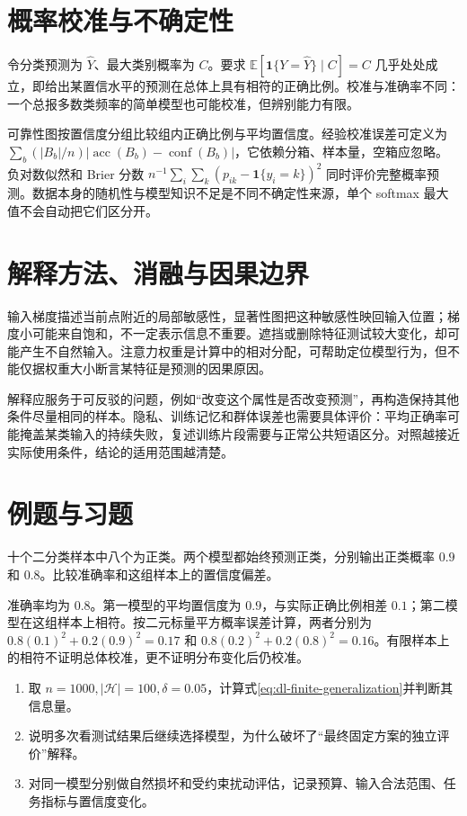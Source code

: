 \documentclass[UTF8,12pt,a4paper,fontset=fandol]{ctexbook}
\begin{document}
\section{概率校准与不确定性}
令分类预测为 $\widehat Y$、最大类别概率为 $C$。要求 $\mathbb E[\mathbf1\{Y=\widehat Y\}\mid C]=C$ 几乎处处成立，即给出某置信水平的预测在总体上具有相符的正确比例。校准与准确率不同：一个总报多数类频率的简单模型也可能校准，但辨别能力有限。

可靠性图按置信度分组比较组内正确比例与平均置信度。经验校准误差可定义为 $\sum_b(|B_b|/n)|\operatorname{acc}(B_b)-\operatorname{conf}(B_b)|$，它依赖分箱、样本量，空箱应忽略。负对数似然和 Brier 分数 $n^{-1}\sum_i\sum_k(p_{ik}-\mathbf1\{y_i=k\})^2$ 同时评价完整概率预测。数据本身的随机性与模型知识不足是不同不确定性来源，单个 softmax 最大值不会自动把它们区分开。

\section{解释方法、消融与因果边界}
输入梯度描述当前点附近的局部敏感性，显著性图把这种敏感性映回输入位置；梯度小可能来自饱和，不一定表示信息不重要。遮挡或删除特征测试较大变化，却可能产生不自然输入。注意力权重是计算中的相对分配，可帮助定位模型行为，但不能仅据权重大小断言某特征是预测的因果原因。

解释应服务于可反驳的问题，例如“改变这个属性是否改变预测”，再构造保持其他条件尽量相同的样本。隐私、训练记忆和群体误差也需要具体评价：平均正确率可能掩盖某类输入的持续失败，复述训练片段需要与正常公共短语区分。对照越接近实际使用条件，结论的适用范围越清楚。

\section{例题与习题}
\begin{example}
十个二分类样本中八个为正类。两个模型都始终预测正类，分别输出正类概率 $0.9$ 和 $0.8$。比较准确率和这组样本上的置信度偏差。
\end{example}
\begin{solve}
准确率均为 $0.8$。第一模型的平均置信度为 $0.9$，与实际正确比例相差 $0.1$；第二模型在这组样本上相符。按二元标量平方概率误差计算，两者分别为 $0.8(0.1)^2+0.2(0.9)^2=0.17$ 和 $0.8(0.2)^2+0.2(0.8)^2=0.16$。有限样本上的相符不证明总体校准，更不证明分布变化后仍校准。
\end{solve}
\begin{enumerate}
\item 取 $n=1000,|\mathcal H|=100,\delta=0.05$，计算式\eqref{eq:dl-finite-generalization}并判断其信息量。
\item 说明多次看测试结果后继续选择模型，为什么破坏了“最终固定方案的独立评价”解释。
\item 对同一模型分别做自然损坏和受约束扰动评估，记录预算、输入合法范围、任务指标与置信度变化。
\end{enumerate}
\end{document}
